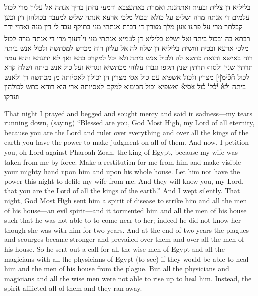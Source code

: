 \begin{aramaictext}
    בליליא דן צלית ובעית ואתחננת ואמרת באתעצבא ודמעי נחתן בריך אנתה
    אל עליון מרי לכול
    עלמים די אנתה מרה ושליט על כולא ובכול מלכי ארעא אנתה שליט
    למעבד בכולהון דין וכען
    קבלתך מרי על פרעו צען מלך מצרין די דברת אנתתי מני בתוקף עבד לי
    דין מנה ואחזי ידך רבתא
    בה ובכול ביתה ואל ישלט בליליא דן לטמיא אנתתי מני וי\textsuperscript{נ}דעוך מרי די
    אנתה מרה לכול מלכי
    ארעא ובכית וחשית בליליא דן שלח לה אל עליון רוח מכדש למכתשה
    ולכול אנש ביתה רוח
    באישא והואת כתשא לה ולכול אנש ביתה ולא יכל למקרב בהא ואף לא
    ידעהא והוא עמה
    תרתין שנין ולסוף תרתין שנין תקפו וגברו עלוהי מכתשיא ונגדיא ועל כול
    אנש ביתה ושלח
    קרא לכול ח֯כ֯י֯מ̇[י] מצרין ולכול אשפיא עם כול אסי מצרין הן יכולון
    לאסי֯ו֯תה מן מכתשה דן ולאנש
    ביתה ול֯א֯ י֯כ֯לו֯ כ֯ול א̇ס̇יא֯ ואשפיא וכול חכימיא למקם לאסיותה ארי הוא
    רוחא כתש לכולהון
    וערקו \vacat
\end{aramaictext}
\begin{translation}
    That night I prayed and begged and sought mercy and said in sadness---my tears running down, (saying) ``Blessed are you, God Most High, my Lord of all
    eternity, because you are the Lord and ruler over everything and over all the kings of the earth you have the power to make judgment on all of them. And now,
    I petition you, oh Lord against Pharoah Zoan, the king of Egypt, because my wife was taken from me by force. Make a restitution for me from him and make visible your mighty hand 
    upon him and upon his whole house. Let him not have the power this night to defile my wife from me. And they will know you, my Lord, that you are the Lord of all the kings of
    the earth.'' And I wept silently. That night, God Most High sent him a spirit of disease to strike him and all the men of his house---an evil
    spirit---and it tormented him and all the men of his house such that he was not able to to come near to her; indeed he did not know her though she was with him 
    for two years. And at the end of two years the plagues and scourges became stronger and prevailed over them and over all the men of his house. So he sent out 
    a call for all the wise men of Egypt and all the magicians with all the physicians of Egypt (to see) if they would be able to heal him and the men of 
    his house from the plague. But all the physicians and magicians and all the wise men were not able to rise up to heal him.  Instead, the spirit afflicted all of them
    and they ran away.
\end{translation}

